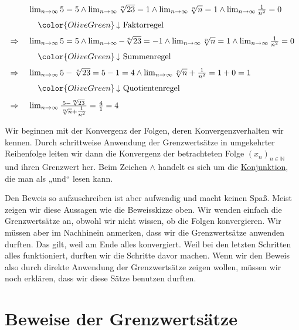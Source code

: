 \documentclass[fontsize=9pt,
               parskip=half-,
               DIV=14,
               listof=chapterentry,
               tocflat]{scrbook}
\begin{document}
\begin{align*}
{\begin{array}{ll}&\lim _{n\rightarrow \infty }5=5\land \lim _{n\rightarrow \infty }{\sqrt[{n}]{23}}=1\land \lim _{n\rightarrow \infty }{\sqrt[{n}]{n}}=1\land \lim _{n\rightarrow \infty }{\tfrac {1}{n^{2}}}=0\\[0.7em]&\quad {\color {OliveGreen}\left\downarrow \ {\text{Faktorregel}}\right.}\\[0.7em]\Rightarrow \ &\lim _{n\rightarrow \infty }5=5\land \lim _{n\rightarrow \infty }-{\sqrt[{n}]{23}}=-1\land \lim _{n\rightarrow \infty }{\sqrt[{n}]{n}}=1\land \lim _{n\rightarrow \infty }{\tfrac {1}{n^{2}}}=0\\[0.7em]&\quad {\color {OliveGreen}\left\downarrow \ {\text{Summenregel}}\right.}\\[0.7em]\Rightarrow \ &\lim _{n\rightarrow \infty }5-{\sqrt[{n}]{23}}=5-1=4\land \lim _{n\rightarrow \infty }{\sqrt[{n}]{n}}+{\tfrac {1}{n^{2}}}=1+0=1\\[0.7em]&\quad {\color {OliveGreen}\left\downarrow \ {\text{Quotientenregel}}\right.}\\[0.7em]\Rightarrow \ &\lim _{n\rightarrow \infty }{\frac {5-{\sqrt[{n}]{23}}}{{\sqrt[{n}]{n}}+{\tfrac {1}{n^{2}}}}}={\frac {4}{1}}=4\end{array}}
\end{align*}

Wir beginnen mit der Konvergenz der Folgen, deren Konvergenzverhalten wir kennen. Durch schrittweise Anwendung der Grenzwertsätze in umgekehrter Reihenfolge leiten wir dann die Konvergenz der betrachteten Folge $(x_{n})_{n\in \mathbb {N} }$ und ihren Grenzwert her. Beim Zeichen $\land $ handelt es sich um die \href{https://de.wikibooks.org/wiki/Mathe\_für\_Nicht-Freaks:\_Junktor\#Anker:Konjunktion}
{Konjunktion}, die man als „und“ lesen kann.

Den Beweis so aufzuschreiben ist aber aufwendig und macht keinen Spaß. Meist zeigen wir diese Aussagen wie die Beweisskizze oben. Wir wenden einfach die Grenzwertsätze an, obwohl wir nicht wissen, ob die Folgen konvergieren. Wir müssen aber im Nachhinein anmerken, dass wir die Grenzwertsätze anwenden durften. Das gilt, weil am Ende alles konvergiert. Weil bei den letzten Schritten alles funktioniert, durften wir die Schritte davor machen. Wenn wir den Beweis also durch direkte Anwendung der Grenzwertsätze zeigen wollen, müssen wir noch erklären, dass wir diese Sätze benutzen durften.
\clearpage
\section{Beweise der Grenzwertsätze}
\end{document}
